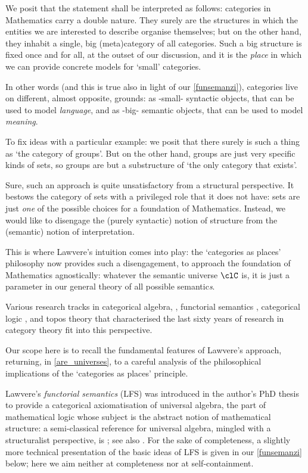 We posit that the statement shall be interpreted as follows: categories in Mathematics carry a double nature. They surely are the structures in which the entities we are interested to describe organise themselves; but on the other hand, they inhabit a single, big (meta)category of all categories. Such a big structure is fixed once and for all, at the outset of our discussion, and it is the \emph{place} in which we can provide concrete models for `small' categories.

In other words (and this is true also in light of our \autoref{funsemanzi}), categories live on different, almost opposite, grounds: as -small- syntactic objects, that can be used to model \emph{language}, and as -big- semantic objects, that can be used to model \emph{meaning}.

To fix ideas with a particular example: we posit that there surely is such a thing as `the category of groups'. But on the other hand, groups are just very specific kinds of sets, so groups are but a substructure of `the only category that exists'.

Sure, such an approach is quite unsatisfactory from a structural perspective. It bestows the category of sets with a privileged role that it does not have: sets are just \emph{one} of the possible choices for a foundation of Mathematics. Instead, we would like to disengage the (purely syntactic) notion of structure from the (semantic) notion of interpretation.

This is where Lawvere's intuition comes into play: the `categories as places' philosophy now provides such a disengagement, to approach the foundation of Mathematics agnostically: whatever the semantic universe $\clC$ is, it is just a parameter in our general theory of all possible semantic\emph{s}.

Various research tracks in categorical algebra, \cite{Janelidze2004}, functorial semantics \cite{lawvere1963functorial,hyland2007category}, categorical logic \cite{lambek1988introduction}, and topos theory \cite{JohnstonePT} that characterised the last sixty years of research in category theory fit into this perspective.

Our scope here is to recall the fundamental features of Lawvere's approach, returning, in \autoref{are_universes}, to a careful analysis of the philosophical implications of the `categories as places' principle.

Lawvere's \emph{functorial semantics} (LFS) was introduced in the author's PhD thesis \cite{lawvere1963functorial} to provide a categorical axiomatisation of universal algebra, the part of mathematical logic whose subject is the abstract notion of mathematical structure: a semi-classical reference for universal algebra, mingled with a structuralist perspective, is \cite{manes2012algebraic}; see also \cite{sankappanavar}. For the sake of completeness, a slightly more technical presentation of the basic ideas of LFS is given in our \autoref{funsemanzi} below; here we aim neither at completeness nor at self-containment.

